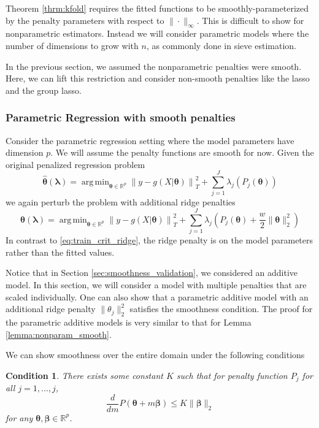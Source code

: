 \documentclass[12pt]{article}
\newtheorem{condition}{Condition}
\DeclareMathOperator*{\argmin}{arg\,min}
\begin{document}
Theorem \ref{thrm:kfold} requires the fitted functions to be smoothly-parameterized by the penalty parameters with respect to $\| \cdot \|_\infty$. This is difficult to show for nonparametric estimators. Instead we will consider parametric models where the number of dimensions to grow with $n$, as commonly done in sieve estimation.

In the previous section, we assumed the nonparametric penalties were smooth. Here, we can lift this restriction and consider non-smooth penalties like the lasso and the group lasso.

\subsubsection{Parametric Regression with smooth penalties}
Consider the parametric regression setting where the model parameters have dimension $p$. We will assume the penalty functions are smooth for now. Given the original penalized regression problem
\begin{equation}
\hat{\boldsymbol{\theta}}(\boldsymbol{\lambda}) = \argmin_{\boldsymbol{\theta} \in \mathbb{R}^p} 
\left  \| y -  g(X| \boldsymbol{\theta}) \right \|^2_T 
+ \sum_{j=1}^J \lambda_j \left ( P_j(\boldsymbol{\theta})\right )
\end{equation}
we again perturb the problem with additional ridge penalties
\begin{equation}
\label{eq:param_ridge}
\hat{\boldsymbol{\theta}}(\boldsymbol{\lambda}) = \argmin_{\boldsymbol{\theta }\in \mathbb{R}^p} 
\left  \| y -  g(X| \boldsymbol{\theta}) \right \|^2_T 
+ \sum_{j=1}^J \lambda_j \left ( P_j(\boldsymbol{\theta}) + \frac{w}{2} \| \boldsymbol{\theta} \|^2_2 \right )
\end{equation}
In contrast to \eqref{eq:train_crit_ridge}, the ridge penalty is on the model parameters rather than the fitted values.

Notice that in Section \ref{sec:smoothness_validation}, we considered an additive model. In this section, we will consider a model with multiple penalties that are scaled individually. One can also show that a parametric additive model with an additional ridge penalty $\| \theta_j\|^2_2$ satisfies the smoothness condition. The proof for the parametric additive models is very similar to that for Lemma \ref{lemma:nonparam_smooth}.

We can show smoothness over the entire domain under the following conditions
\begin{condition}
\label{condn:param1}
There exists some constant $K$ such that for penalty function $P_j$ for all $j=1,...,j$,
\begin{equation}
\frac{d}{d m}P(\boldsymbol{\theta} + m \boldsymbol{\beta}) \le K \|\boldsymbol{\beta}\|_{2}
\end{equation}
for any $\boldsymbol{\theta}, \boldsymbol{\beta} \in \mathbb{R}^p$.
\end{condition}
\end{document}
